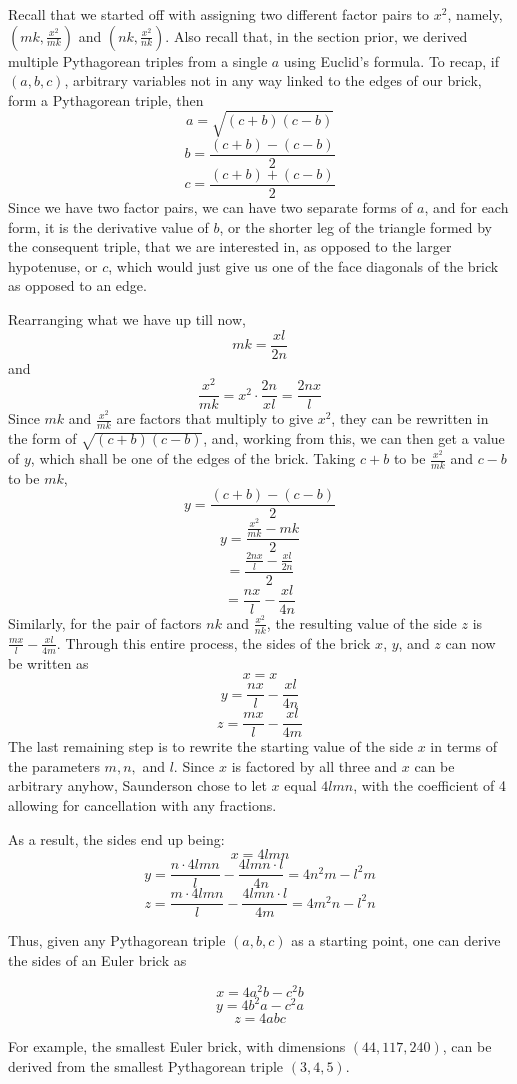 \documentclass[11pt]{article}
\begin{document}
Recall that we started off with assigning two different factor pairs to $x^2$, namely, $(mk, \frac{x^2}{mk})$ and $(nk, \frac{x^2}{nk})$. Also recall that, in the section prior, we derived multiple Pythagorean triples from a single $a$ using Euclid's formula. To recap, if $(a, b, c)$, arbitrary variables not in any way linked to the edges of our brick, form a Pythagorean triple,
then 
$$a=\sqrt{(c+b)(c-b)}$$
$$b=\frac{(c+b)-(c-b)}{2}$$
$$c=\frac{(c+b)+(c-b)}{2}$$
Since we have two factor pairs, we can have two separate forms of $a$, and for each form, it is the derivative value of $b$, or the shorter leg of the triangle formed by the consequent triple, that we are interested in, as opposed to the larger hypotenuse, or $c$, which would just give us one of the face diagonals of the brick as opposed to an edge.

Rearranging what we have up till now,
$$mk=\frac{xl}{2n}$$
and 
$$\frac{x^2}{mk}=x^2\cdot{\frac{2n}{xl}}=\frac{2nx}{l}$$
Since $mk$ and $\frac{x^2}{mk}$ are factors that multiply to give $x^2$, they can be rewritten in the form of $\sqrt{(c+b)(c-b)}$, and, working from this, we can then get a value of $y$, which shall be one of the edges of the brick. Taking $c+b$ to be $\frac{x^2}{mk}$ and $c-b$ to be $mk$, 
$$y=\frac{(c+b)-(c-b)}{2}$$
$$y=\frac{\frac{x^2}{mk}-mk}{2}$$
$$=\frac{\frac{2nx}{l}-\frac{xl}{2n}}{2}$$
$$=\frac{nx}{l}-\frac{xl}{4n}$$
Similarly, for the pair of factors $nk$ and $\frac{x^2}{nk}$, the resulting value of the side $z$ is $\frac{mx}{l}-\frac{xl}{4m}$.
Through this entire process, the sides of the brick $x$, $y$, and $z$ can now be written as
$$x=x$$
$$y=\frac{nx}{l}-\frac{xl}{4n}$$
$$z=\frac{mx}{l}-\frac{xl}{4m}$$
The last remaining step is to rewrite the starting value of the side $x$ in terms of the parameters $m, n,$ and $l$. Since $x$ is factored by all three and $x$ can be arbitrary anyhow, Saunderson chose to let $x$ equal $4lmn$, with the coefficient of 4 allowing for cancellation with any fractions.

As a result, the sides end up being:
$$x=4lmn$$
$$y=\frac{n\cdot{4lmn}}{l}-\frac{4lmn\cdot{l}}{4n}=4n^2m-l^2m$$
$$z=\frac{m\cdot{4lmn}}{l}-\frac{4lmn\cdot{l}}{4m}=4m^2n-l^2n$$

Thus, given any Pythagorean triple $(a, b, c)$ as a starting point, one can derive the sides of an Euler brick as

$$x=4a^2b-c^2b$$
$$y=4b^2a-c^2a$$
$$z=4abc$$

For example, the smallest Euler brick, with dimensions $(44, 117, 240)$, can be derived from the smallest Pythagorean triple $(3, 4, 5)$.
\end{document}
